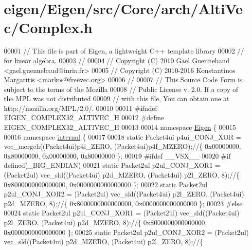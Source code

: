 \hypertarget{eigen_2_eigen_2src_2_core_2arch_2_alti_vec_2_complex_8h_source}{}\section{eigen/\+Eigen/src/\+Core/arch/\+Alti\+Vec/\+Complex.h}
\label{eigen_2_eigen_2src_2_core_2arch_2_alti_vec_2_complex_8h_source}

\begin{DoxyCode}
00001 \textcolor{comment}{// This file is part of Eigen, a lightweight C++ template library}
00002 \textcolor{comment}{// for linear algebra.}
00003 \textcolor{comment}{//}
00004 \textcolor{comment}{// Copyright (C) 2010 Gael Guennebaud <gael.guennebaud@inria.fr>}
00005 \textcolor{comment}{// Copyright (C) 2010-2016 Konstantinos Margaritis <markos@freevec.org>}
00006 \textcolor{comment}{//}
00007 \textcolor{comment}{// This Source Code Form is subject to the terms of the Mozilla}
00008 \textcolor{comment}{// Public License v. 2.0. If a copy of the MPL was not distributed}
00009 \textcolor{comment}{// with this file, You can obtain one at http://mozilla.org/MPL/2.0/.}
00010 
00011 \textcolor{preprocessor}{#ifndef EIGEN\_COMPLEX32\_ALTIVEC\_H}
00012 \textcolor{preprocessor}{#define EIGEN\_COMPLEX32\_ALTIVEC\_H}
00013 
00014 \textcolor{keyword}{namespace }\hyperlink{namespace_eigen}{Eigen} \{
00015 
00016 \textcolor{keyword}{namespace }\hyperlink{namespaceinternal}{internal} \{
00017 
00018 \textcolor{keyword}{static} Packet4ui  p4ui\_CONJ\_XOR = vec\_mergeh((Packet4ui)p4i\_ZERO, (Packet4ui)p4f\_MZERO);\textcolor{comment}{//\{ 0x00000000,
       0x80000000, 0x00000000, 0x80000000 \};}
00019 \textcolor{preprocessor}{#ifdef \_\_VSX\_\_}
00020 \textcolor{preprocessor}{#if defined(\_BIG\_ENDIAN)}
00021 \textcolor{keyword}{static} Packet2ul  p2ul\_CONJ\_XOR1 = (Packet2ul) vec\_sld((Packet4ui) p2d\_MZERO, (Packet4ui) p2l\_ZERO, 8);\textcolor{comment}{//\{
       0x8000000000000000, 0x0000000000000000 \};}
00022 \textcolor{keyword}{static} Packet2ul  p2ul\_CONJ\_XOR2 = (Packet2ul) vec\_sld((Packet4ui) p2l\_ZERO,  (Packet4ui) p2d\_MZERO, 8);\textcolor{comment}{//\{
       0x8000000000000000, 0x0000000000000000 \};}
00023 \textcolor{preprocessor}{#else}
00024 \textcolor{keyword}{static} Packet2ul  p2ul\_CONJ\_XOR1 = (Packet2ul) vec\_sld((Packet4ui) p2l\_ZERO,  (Packet4ui) p2d\_MZERO, 8);\textcolor{comment}{//\{
       0x8000000000000000, 0x0000000000000000 \};}
00025 \textcolor{keyword}{static} Packet2ul  p2ul\_CONJ\_XOR2 = (Packet2ul) vec\_sld((Packet4ui) p2d\_MZERO, (Packet4ui) p2l\_ZERO, 8);\textcolor{comment}{//\{
}
\end{DoxyCode}

